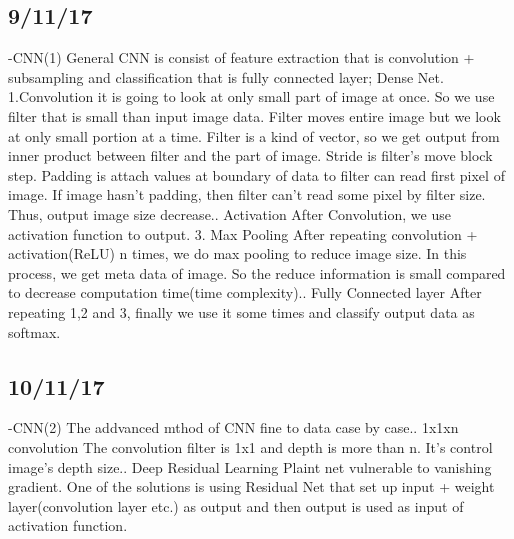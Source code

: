 \documentclass{article}
\begin{document}
\begin{CJK}{UTF8}{}
\subsection{9/11/17}
-CNN(1)\newline
General CNN is consist of feature extraction that is convolution + subsampling and classification that is fully connected layer; Dense Net. 
1.Convolution\newline
it is going to look at only small part of image at once. So we use filter that is small than input image data. Filter moves entire image but we look at only small portion at a time.
Filter is a kind of vector, so we get output from inner product between filter and the part of image.\newline
Stride is filter's move block step. Padding is attach values at boundary of data to filter can read first pixel of image. If image hasn't padding, then filter can't read some pixel by filter size. Thus, output image size decrease.. Activation\newline
After Convolution, we use activation function to output.
3. Max Pooling\newline
After repeating convolution + activation(ReLU) n times, we do max pooling to reduce image size. In this process, we get meta data of image. So the reduce information is small compared to decrease computation time(time complexity).. Fully Connected layer\newline
After repeating 1,2 and 3, finally we use it some times and classify output data as softmax.\newline
\subsection{10/11/17}
-CNN(2)\newline
The addvanced mthod of CNN fine to data case by case.. 1x1xn convolution\newline
The convolution filter is 1x1 and depth is more than n. It's control image's depth size.. Deep Residual Learning\newline
Plaint net vulnerable to vanishing gradient. One of the solutions is using Residual Net that set up input + weight layer(convolution layer etc.) as output and then output is used as input of activation function.








\end{CJK}
\end{document}
